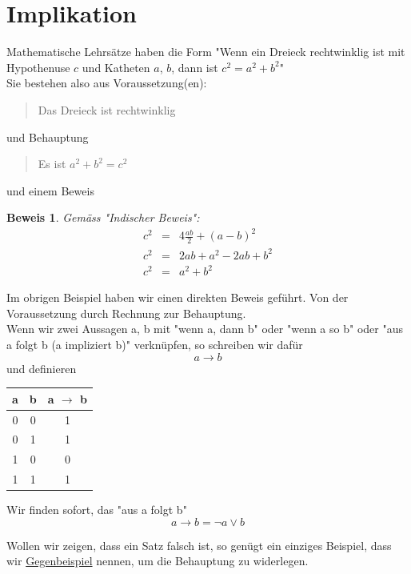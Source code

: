 \documentclass{report}
\newtheorem{myproof}{Beweis}
\begin{document}
\section{Implikation}
Mathematische Lehrsätze haben die Form "Wenn ein Dreieck rechtwinklig ist mit Hypothenuse $c$ und Katheten $a$, $b$, dann ist $c^2=a^2+b^2$"\\
Sie bestehen also aus Voraussetzung(en):
\begin{quote}Das Dreieck ist rechtwinklig\end{quote}
und Behauptung
\begin{quote}Es ist $a^2+b^2=c^2$\end{quote}
und einem Beweis
\begin{myproof}Gemäss "Indischer Beweis":
\begin{eqnarray}c^2&=&4\frac{ab}{2}+(a-b)^2 \nonumber \\
c^2&=&2ab+a^2-2ab+b^2\nonumber \\
c^2&=&a^2+b^2\end{eqnarray}\end{myproof}
Im obrigen Beispiel haben wir einen direkten Beweis geführt. Von der Voraussetzung durch Rechnung zur Behauptung.\\
Wenn wir zwei Aussagen a, b mit "wenn a, dann b" oder "wenn a so b" oder "aus a folgt b (a impliziert b)" verknüpfen, so schreiben wir dafür
\begin{equation}a \to b\end{equation}
und definieren
\begin{center}\begin{tabular}{c c | c}
a & b & a \(\to\) b\\
\hline
0 & 0 & 1  \\
0 & 1 & 1  \\
1 & 0 & 0 \\
1 & 1 & 1 \\
\end{tabular}\end{center}
Wir finden sofort, das "aus a folgt b"
\begin{equation}a \to b = \lnot a \lor b\end{equation}

Wollen wir zeigen, dass ein Satz falsch ist, so genügt ein einziges Beispiel, dass wir \underline{Gegenbeispiel} nennen, um die Behauptung zu widerlegen.\\
\end{document}
